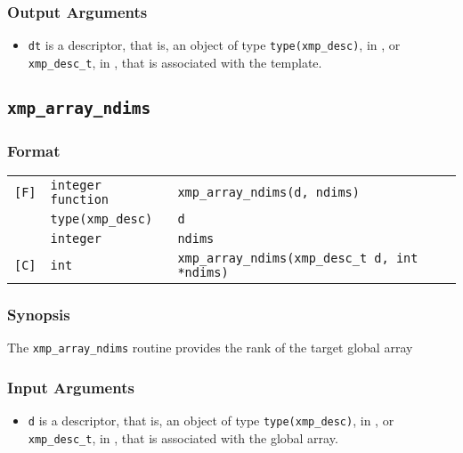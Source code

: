 \subsubsection*{Output Arguments}
\begin{itemize}
 \item {\tt dt} is a descriptor, that is, an object of type 
       {\tt type(xmp\_desc)}, in {\XMPF}, or {\tt xmp\_desc\_t},
       in {\XMPC}, that is associated with the template.
\end{itemize}


\subsection{\tt xmp\_array\_ndims}

\subsubsection*{Format}

\begin{tabular}{lll}

\verb![F]!& {\tt integer function}& {\tt xmp\_array\_ndims(d, ndims)}\\
          & {\tt type(xmp\_desc)} & {\tt d}\\
          & {\tt integer} & {\tt ndims}\\

\verb![C]!&  {\tt int}& {\tt xmp\_array\_ndims(xmp\_desc\_t d, int *ndims)}\\

\end{tabular}

\subsubsection*{Synopsis}

The {\tt xmp\_array\_ndims} routine provides the rank of the target global array


\subsubsection*{Input Arguments}
\begin{itemize}
 \item {\tt d} is a descriptor, that is, an object of type 
       {\tt type(xmp\_desc)}, in {\XMPF}, or {\tt xmp\_desc\_t},
       in {\XMPC}, that is associated with the global array.
\end{itemize}

